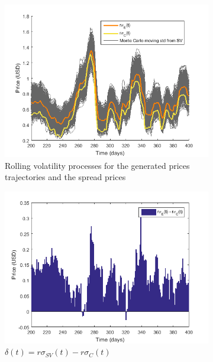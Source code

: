 \documentclass[11pt,a4,twosided,singlespacing,titlepagenumber=on]{scrreprt}
\numberwithin{equation}{chapter} %
\theoremstyle{remark}
\begin{document}
\begin{figure}[H]
    \centering
    \begin{subfigure}[t]{0.49\textwidth}
        \centering
        \includegraphics[width=1\textwidth]{model_vol/3}
        \caption{Rolling volatility processes for the generated prices trajectories and the spread prices}
        \label{vol_mod_3}
    \end{subfigure}
    \begin{subfigure}[t]{0.49\textwidth}
        \centering
        \includegraphics[width=1\textwidth]{model_vol/5}
        \caption{$\delta(t) = r\sigma_{SV}(t) - r\sigma_C(t)$}
        \label{fig:diff_vol}
    \end{subfigure}
    \begin{subfigure}[t]{0.49\textwidth}

\end{subfigure}
\end{figure}
\end{document}
